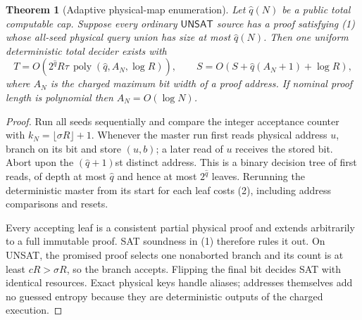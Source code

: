 \documentclass[11pt]{article}
\newtheorem{theorem}{Theorem}
\newcommand{\UNSAT}{\mathsf{UNSAT}}
\begin{document}
\begin{theorem}[Adaptive physical-map enumeration]
Let $\widehat q(N)$ be a public total computable cap.  Suppose every ordinary
$\UNSAT$ source has a proof satisfying (1) whose all-seed physical query union
has size at most $\widehat q(N)$.  Then one uniform deterministic total decider
exists with
\[
 T=O\!\left(2^{\widehat q}R\tau\,
       \operatorname{poly}(\widehat q,A_N,\log R)\right),\qquad
 S=O\!\left(S+\widehat q(A_N+1)+\log R\right),                    \tag{2}
\]
where $A_N$ is the charged maximum bit width of a proof address.  If nominal
proof length is polynomial then $A_N=O(\log N)$.
\end{theorem}
\begin{proof}
Run all seeds sequentially and compare the integer acceptance counter with
$k_N=\lfloor\sigma R\rfloor+1$.  Whenever the master run first reads physical
address $u$, branch on its bit and store $(u,b)$; a later read of $u$ receives
the stored bit.  Abort upon the $(\widehat q+1)$st distinct address.  This is
a binary decision tree of first reads, of depth at most $\widehat q$ and hence
at most $2^{\widehat q}$ leaves.  Rerunning the deterministic master from its
start for each leaf costs (2), including address comparisons and resets.

Every accepting leaf is a consistent partial physical proof and extends
arbitrarily to a full immutable proof.  SAT soundness in (1) therefore rules
it out.  On UNSAT, the promised proof selects one nonaborted branch and its
count is at least $cR>\sigma R$, so the branch accepts.  Flipping the final
bit decides SAT with identical resources.  Exact physical keys handle aliases;
addresses themselves add no guessed entropy because they are deterministic
outputs of the charged execution.
\end{proof}
\end{document}
